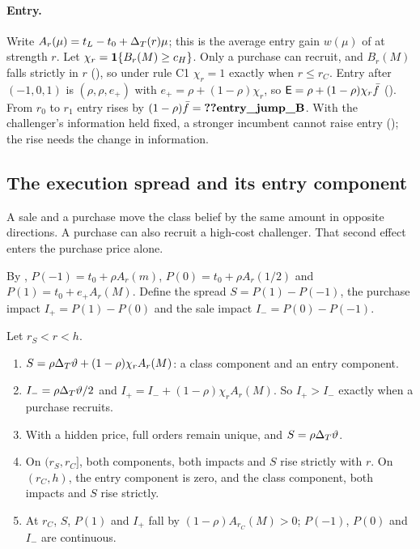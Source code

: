 \paragraph{Entry.} Write \(A_r(\mu)=t_L-t_0+\Delta_T(r)\mu\); this is the average entry gain \(w(\mu)\) of
 at strength \(r\). Let \(\chi_r=\mathbf{1}\{B_r(M)\ge c_H\}\). Only a purchase can recruit, and
\(B_r(M)\) falls strictly in \(r\) (), so under rule C1 \(\chi_r=1\) exactly when
\(r\le r_C\). Entry after \((-1,0,1)\) is \((\rho,\rho,e_+)\) with \(e_+=\rho+(1-\rho)\chi_r\), so
\(\mathsf{E}=\rho+(1-\rho)\chi_r\bar f\) (). From \(r_0\) to \(r_1\) entry rises by
\((1-\rho)\bar f=\reg{entry_jump_B}\). With the challenger's information held fixed, a stronger incumbent cannot raise
entry (); the rise needs the change in information.

\subsection{The execution spread and its entry component}\label{sec:12_empirical-spread}

\begin{intuition}
A sale and a purchase move the class belief by the same amount in opposite directions. A purchase can also recruit a
high-cost challenger. That second effect enters the purchase price alone.
\end{intuition}

By , \(P(-1)=t_0+\rho A_r(m)\), \(P(0)=t_0+\rho A_r(1/2)\) and
\(P(1)=t_0+e_+A_r(M)\). Define the spread \(S=P(1)-P(-1)\), the purchase impact \(I_+=P(1)-P(0)\) and the sale
impact \(I_-=P(0)-P(-1)\).

\begin{resultbox}
Let \(r_S<r<h\).
\begin{enumerate}[label=(\roman*),leftmargin=2em]
\item \(S=\rho\Delta_T\vartheta+(1-\rho)\chi_rA_r(M)\): a class component and an entry component.
\item \(I_-=\rho\Delta_T\vartheta/2\) and \(I_+=I_-+(1-\rho)\chi_rA_r(M)\). So \(I_+>I_-\) exactly when a purchase recruits.
\item With a hidden price, full orders remain unique, and \(S=\rho\Delta_T\vartheta\).
\item On \((r_S,r_C]\), both components, both impacts and \(S\) rise strictly with \(r\). On \((r_C,h)\), the entry
component is zero, and the class component, both impacts and \(S\) rise strictly.
\item At \(r_C\), \(S\), \(P(1)\) and \(I_+\) fall by \((1-\rho)A_{r_C}(M)>0\); \(P(-1)\), \(P(0)\) and \(I_-\) are continuous.
\end{enumerate}
\end{resultbox}

